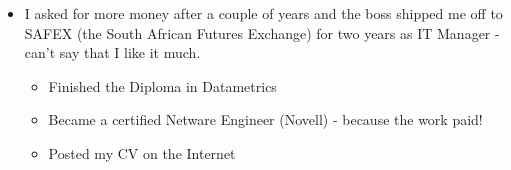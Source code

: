 \begin{frame}
	\begin{itemize}
		\item I asked for more money after a couple of years and the boss shipped me off to SAFEX (the South African Futures Exchange) for two years as IT Manager - can't say that I like it much.
		\begin{itemize}
			\item Finished the Diploma in Datametrics
			\item Became a certified Netware Engineer (Novell) - because the work paid!
			\item Posted my CV on the Internet
		\end{itemize}
	\end{itemize}
	\note{}
\end{frame}